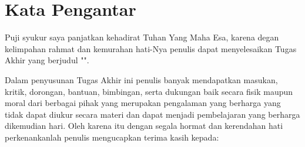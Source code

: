 \chapter*{Kata Pengantar}

Puji syukur saya panjatkan kehadirat Tuhan Yang Maha Esa, karena degan kelimpahan rahmat dan kemurahan hati-Nya penulis dapat menyelesaikan Tugas Akhir yang berjudul "\thetitle". 

Dalam penyusunan Tugas Akhir ini penulis banyak mendapatkan masukan, kritik, dorongan, bantuan, bimbingan, serta dukungan baik secara fisik maupun moral dari berbagai pihak yang merupakan pengalaman yang berharga yang tidak dapat diukur secara materi dan dapat menjadi pembelajaran yang berharga dikemudian hari. Oleh karena itu dengan segala hormat dan kerendahan hati perkenankanlah penulis mengucapkan terima kasih kepada:

